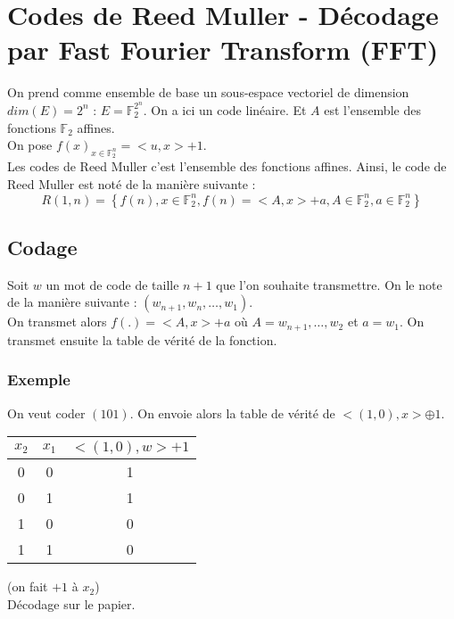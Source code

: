 \section{Codes de Reed Muller - Décodage par Fast Fourier Transform (FFT)}
On prend comme ensemble de base un sous-espace vectoriel de dimension $dim(E)=2^n$ : $E=\mathbb{F}_2^{2^n}$. On a ici un code linéaire. Et $A$ est l'ensemble des fonctions $\mathbb{F}_2$ affines.\\
On pose $f(x)_{x\in\mathbb{F}_2^n}=<u,x>+1$.\\
Les codes de Reed Muller c'est l'ensemble des fonctions affines. Ainsi, le code de Reed Muller est noté de la manière suivante :
\begin{equation}
 R(1,n)=\left\{f(n), x\in\mathbb{F}_2^n, f(n)=<A,x>+a, A\in\mathbb{F}_2^n, a\in\mathbb{F}_2^n \right\}
\end{equation}
\subsection{Codage}
Soit $w$ un mot de code de taille $n+1$ que l'on souhaite transmettre. On le note de la manière suivante : $\left(w_{n+1}, w_n, \ldots, w_1\right)$.\\
On transmet alors $f(.)=<A,x>+a$ où $A=w_{n+1}, \ldots, w_2$ et $a=w_1$. On transmet ensuite la table de vérité de la fonction.\\
\subsubsection{Exemple}
On veut coder $(101)$. On envoie alors la table de vérité de $<(1,0),x>\oplus1$.\\
\begin{center}
  \begin{tabular}{cc|c}
  $x_2$ & $x_1$ & $<(1,0),w>+1$\\\hline
  0 & 0 & 1\\
  0 & 1 & 1\\
  1 & 0 & 0\\
  1 & 1 & 0\\
  \end{tabular}
\end{center}
(on fait $+1$ à $x_2$)\\
Décodage sur le papier.\\
